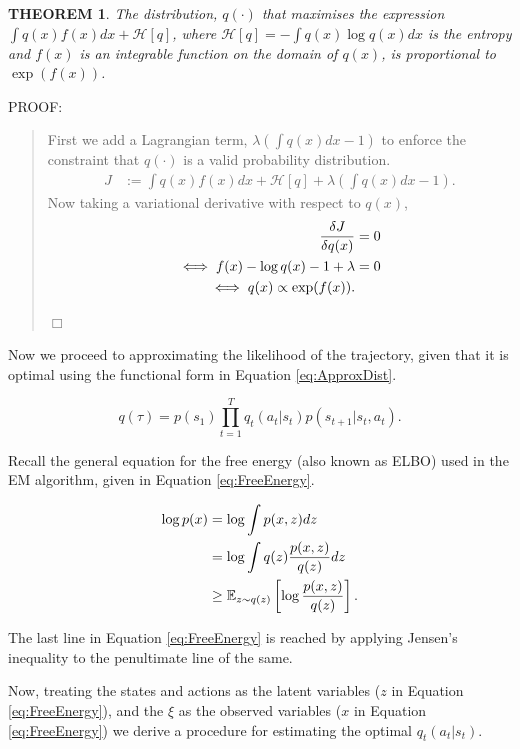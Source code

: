 \documentclass{report}
\newtheorem{theorem}{THEOREM}
\newenvironment{proof}{
PROOF:
\begin{quotation}}{
$\Box$ \end{quotation}}
\numberwithin{equation}{section}
\numberwithin{figure}{section}
\numberwithin{table}{section}
\numberwithin{algorithm}{section}
\begin{document}
\begin{theorem}\label{thm:OptDist}
  The distribution, $q(\cdot)$ that maximises the expression 
  $\int q(x)f(x)dx + \mathcal{H}[q]$, where $\mathcal{H}[q]=-\int q(x)\log q(x)dx$
  is the entropy 
  and $f(x)$ is an integrable function on the domain of $q(x)$, 
  is proportional to $\exp (f(x))$.
\end{theorem}

\begin{proof}
  First we add a Lagrangian term, $\lambda(\int q(x)dx - 1)$ to 
  enforce the constraint that $q(\cdot)$ is a valid probability 
  distribution.
  \begin{align}
    J&:=\int q(x)f(x)dx + \mathcal{H}[q] + \lambda\left(\int q(x)dx - 1\right).
  \end{align}
  Now taking a variational derivative with respect to $q(x)$,
  \begin{align}
    \frac{\delta J}{\delta q(x)} &=0\notag\\
    \iff f(x) - \log q(x) - 1 + \lambda &=0\notag\\
    \iff q(x)\propto \exp(f(x)).
  \end{align}
\end{proof}

Now we proceed to approximating the likelihood of the trajectory, 
given that it is optimal using the functional form in Equation 
\ref{eq:ApproxDist}.

\begin{equation}\label{eq:ApproxDist}
  q(\tau)=p(s_1)\prod_{t=1}^Tq_t(a_t|s_t)p(s_{t+1}|s_t,a_t).
\end{equation}

Recall the general equation for the free energy (also known as ELBO) 
used in the EM algorithm, given in Equation \ref{eq:FreeEnergy}.

\begin{align}\label{eq:FreeEnergy}
  \log p(x)&=\log \int p(x,z)dz\notag\\
  &=\log \int q(z)\frac{p(x,z)}{q(z)}dz\notag\\
  &\ge \mathbb{E}_{z\sim q(z)}\left[\log \frac{p(x, z)}{q(z)}\right].
\end{align}

The last line in Equation \ref{eq:FreeEnergy} is reached by applying 
Jensen's inequality to the penultimate line of the same.

Now, treating the states and actions as the latent variables
($z$ in Equation \ref{eq:FreeEnergy}), 
and the $\xi$ as the observed variables ($x$ in Equation \ref{eq:FreeEnergy})
we derive a procedure for estimating the optimal $q_t(a_t|s_t)$.
\end{document}
